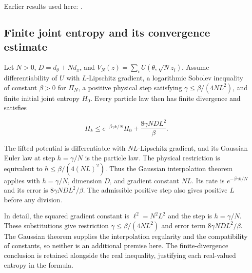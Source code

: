 \documentclass[11pt,a4paper]{report}
\begin{document}
Earlier results used here: \cite[Section~3.29]{LangevinLean2026ULALSI}.
\subsection{\texorpdfstring{Finite joint entropy and its convergence estimate}{Finite joint entropy and its convergence estimate}}
\label{report-step-IPLA-LSI-UnconditionalTheorem-lean-1}


Let \(N>0\), \(D=d_\theta+Nd_x\), and \(V_N(z)=\sum_iU(\theta,\sqrt N z_i)\). Assume differentiability of \(U\) with \(L\)-Lipschitz gradient, a logarithmic Sobolev inequality of constant \(\beta>0\) for \(\Pi_N\), a positive physical step satisfying \(\gamma\le\beta/(4NL^2)\), and finite initial joint entropy \(H_0\). Every particle law then has finite divergence and satisfies

\[H_k\le e^{-\beta\gamma k/N}H_0+\frac{8\gamma ND L^2}{\beta}.\]

The lifted potential is differentiable with \(NL\)-Lipschitz gradient, and its Gaussian Euler law at step \(h=\gamma/N\) is the particle law. The physical restriction is equivalent to \(h\le\beta/(4(NL)^2)\). Thus the Gaussian interpolation theorem applies with \(h=\gamma/N\), dimension \(D\), and gradient constant \(NL\). Its rate is \(e^{-\beta\gamma k/N}\) and its error is \(8\gamma ND L^2/\beta\). The admissible positive step also gives positive \(L\) before any division.



In detail, the squared gradient constant is \(\ell^2=N^2L^2\) and the step is \(h=\gamma/N\). These substitutions give restriction \(\gamma\le\beta/(4NL^2)\) and error term \(8\gamma NDL^2/\beta\). The Gaussian theorem supplies the interpolation regularity and the compatibility of constants, so neither is an additional premise here. The finite-divergence conclusion is retained alongside the real inequality, justifying each real-valued entropy in the formula.
\end{document}
